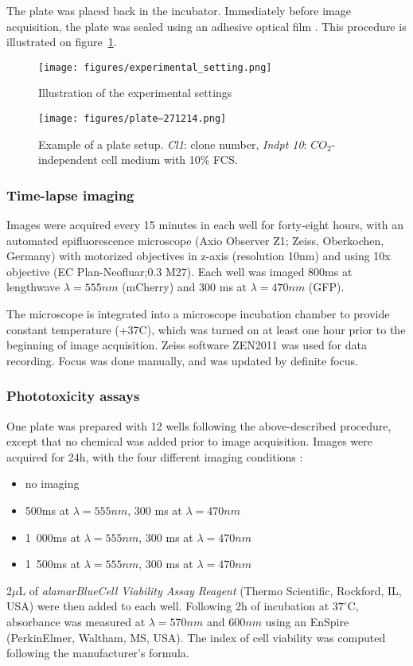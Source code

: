 The plate was placed back in the incubator. Immediately before image acquisition, the plate was sealed using an adhesive optical film%
. This procedure is illustrated on figure~\ref{exp_setting}.

\begin{figure}
\centering
\texttt{[image: figures/experimental\_setting.png]}
\caption{Illustration of the experimental settings}
\label{exp_setting}
\end{figure}
\begin{figure}
\centering
\texttt{[image: figures/plate--271214.png]}
\caption{Example of a plate setup. \textit{Cl1}: clone number, \textit{Indpt 10}: $CO_2$-independent cell medium with 10\% FCS.}
\label{plate_setup}
\end{figure}
\subsubsection{Time-lapse imaging}
Images were acquired every 15 minutes in each well for forty-eight hours, with an automated epifluorescence microscope (Axio Observer Z1; Zeiss, Oberkochen, Germany) with motorized objectives in z-axis (resolution 10nm) and using 10x objective (EC Plan-Neofluar;0.3 M27). Each well was imaged 800ms at lengthwave $\lambda = 555nm$ (mCherry) and 300 ms at $\lambda = 470nm$ (GFP).

The microscope is integrated into a microscope incubation chamber to provide constant temperature (+37C), which was turned on at least one hour prior to the beginning of image acquisition. Zeiss software ZEN2011 was used for data recording. Focus was done manually, and was updated by definite focus.
\subsubsection{Phototoxicity assays}
One plate was prepared with 12 wells following the above-described procedure, except that no chemical was added prior to image acquisition. Images were acquired for 24h, with the four different imaging conditions :
\begin{itemize}
\item no imaging
\item 500ms at $\lambda = 555nm$, 300 ms at $\lambda = 470nm$
\item 1~000ms at $\lambda = 555nm$, 300 ms at $\lambda = 470nm$
\item 1~500ms at $\lambda = 555nm$, 300 ms at $\lambda = 470nm$
\end{itemize}
2$\mu$L of \textit{alamarBlue\texttrademark Cell Viability Assay Reagent} (Thermo Scientific, Rockford, IL, USA) were then added to each well. Following 2h of incubation at $37^\circ$C, absorbance was measured at $\lambda = 570nm$ and $600nm$ using an EnSpire\up{\textregistered} (PerkinElmer, Waltham, MS, USA). The index of cell viability was computed following the manufacturer's formula.

